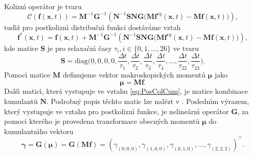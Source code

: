         Kolizn\'{\i} oper\'{a}tor je tvaru \cite{geier2015cumulant}
        \begin{equation}
            \label{eq:CumOpe}
                \mathcal{C}(\boldsymbol{f}(\boldsymbol{x},t)) = \boldsymbol{M}^{-1}\boldsymbol{G}^{-1}\left(\boldsymbol{N}^{-1}\boldsymbol{S}\boldsymbol{N}\boldsymbol{G}\Big(\boldsymbol{M}\boldsymbol{f}^{eq}(\boldsymbol{x},t) - \boldsymbol{M}\boldsymbol{f}(\boldsymbol{x},t)\Big)\right),
        \end{equation}
        tud\'{\i}\v{z} pro postkolizn\'{\i} distribu\v{c}n\'{\i} funkci dost\'{a}v\'{a}me vztah
        \begin{equation}
        \label{eq:PosColCum}
            \boldsymbol{f}^{*}(\boldsymbol{x},t) = \boldsymbol{f}(\boldsymbol{x},t) + \boldsymbol{M}^{-1}\boldsymbol{G}^{-1}\left(\boldsymbol{N}^{-1}\boldsymbol{S}\boldsymbol{N}\boldsymbol{G}\Big(\boldsymbol{M}\boldsymbol{f}^{eq}(\boldsymbol{x},t) - \boldsymbol{M}\boldsymbol{f}(\boldsymbol{x},t)\Big)\right),
        \end{equation}
        kde matice $\boldsymbol{S}$ je pro relaxa\v{c}n\'{\i} \v{c}asy $\tau_i, i \in \{ 0,1,\dots,26 \}$ ve tvaru
        \begin{equation}
        \label{eq:MatSCum}
            \boldsymbol{S} = \mathrm{diag}\Bigg(0, 0, 0, 0,  \frac{\Delta t}{\tau_1}, \frac{\Delta t}{\tau_2}, \frac{\Delta t}{\tau_3}, \frac{\Delta t}{\tau_4},\dots,\frac{\Delta t}{\tau_{22}}, \frac{\Delta t}{\tau_{23}} \Bigg).
        \end{equation}
        Pomoc\'{\i} matice $\boldsymbol{M}$ definujeme vektor makroskopick\'{y}ch moment\r{u} $\boldsymbol{\mu}$ jako
        \begin{equation}
            \label{eq:MatMCum}    
                \boldsymbol{\mu} = \boldsymbol{M}\boldsymbol{f}.
        \end{equation}
        Dal\v{s}\'{\i} matic\'{\i}, kter\'{a} vystupuje ve vztahu \eqref{eq:PosColCum}, je matice kombinace kumulant\r{u} $\boldsymbol{N}$. Podrobn\'{y} popis t\v{e}chto matic lze nal\'{e}zt v \cite{geier2015cumulant}. Posledn\'{\i}m v\'{y}razem, kter\'{y} vystupuje ve vztahu pro postkolizn\'{\i} funkce, je neline\'{a}rn\'{\i} oper\'{a}tor $\boldsymbol{G}$, za pomoci kter\'{e}ho je provedena transformace obecn\'{y}ch moment\r{u} $\boldsymbol{\mu}$ do kumulantn\'{\i}ho vektoru  
        \begin{equation}
            \label{eq:OpeGCum}
                \boldsymbol{\gamma} = \boldsymbol{G}(\boldsymbol{\mu}) = \boldsymbol{G(Mf)} = \left( \gamma_{(0,0,0)}, \gamma_{(1,0,0)}, \gamma_{(0,1,0)},\dots, \gamma_{(2,2,2)} \right)^\intercal.
        \end{equation}

